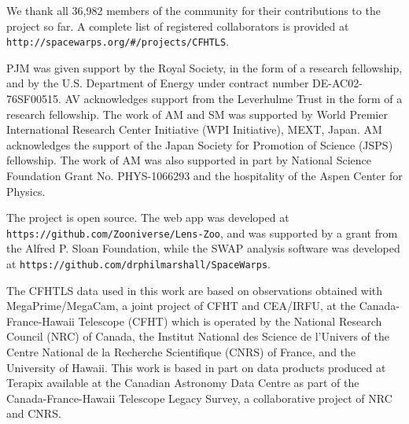 We thank all 36,982 members of the \sw community for their
contributions to the project so far. A complete list of registered
collaborators is provided at \texttt{http://spacewarps.org/\#/projects/CFHTLS}.

PJM was given support by the Royal Society, in the form of a research
fellowship, and by the U.S. Department of Energy under contract number DE-AC02-76SF00515.
%
AV acknowledges support from the Leverhulme Trust in the form of a research
fellowship.
%
The work of AM and SM was supported by World Premier International Research
Center Initiative (WPI Initiative), MEXT, Japan. AM acknowledges the support of
the Japan Society for Promotion of Science (JSPS) fellowship. The work of AM
was also supported in part by National Science Foundation Grant No.
PHYS-1066293 and the hospitality of the Aspen Center for Physics. 
%
%

The \sw project is open source.
The web app was developed at \texttt{https://github.com/Zooniverse/Lens-Zoo}, and was supported by a grant from the Alfred P. Sloan Foundation, 
while the SWAP analysis software was developed at
\texttt{https://github.com/drphilmarshall/SpaceWarps}.

The CFHTLS data used in this work are based on observations obtained with
MegaPrime/MegaCam, a joint project of CFHT and CEA/IRFU, at the
Canada-France-Hawaii Telescope (CFHT) which is operated by the National Research
Council (NRC) of Canada, the Institut National des Science de l'Univers of the
Centre National de la Recherche Scientifique (CNRS) of France, and the
University of Hawaii. This work is based in part on data products produced at
Terapix available at the Canadian Astronomy Data Centre as part of the
Canada-France-Hawaii Telescope Legacy Survey, a collaborative project of NRC and
CNRS.
